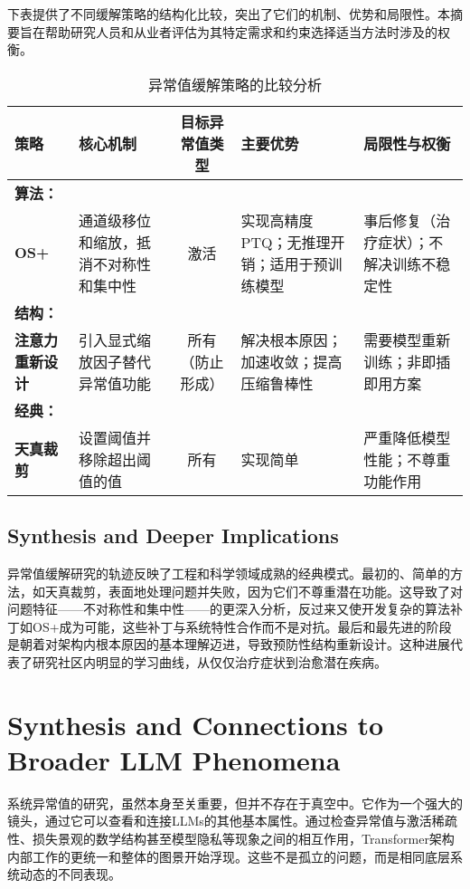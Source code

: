 \documentclass{article}
\begin{document}
下表提供了不同缓解策略的结构化比较，突出了它们的机制、优势和局限性。本摘要旨在帮助研究人员和从业者评估为其特定需求和约束选择适当方法时涉及的权衡。

\begin{table}
  \caption{异常值缓解策略的比较分析}
  \label{mitigation-strategies}
  \centering
  \small
  \begin{tabular}{l p{3.5cm} c p{3cm} p{3cm}}
    \toprule
    策略 & 核心机制 & 目标异常值类型 & 主要优势 & 局限性与权衡 \\
    \midrule
    \textbf{算法：}\\\textbf{OS+} & 通道级移位和缩放，抵消不对称性和集中性 & 激活 & 实现高精度PTQ；无推理开销；适用于预训练模型 & 事后修复（治疗症状）；不解决训练不稳定性 \\
    \textbf{结构：}\\\textbf{注意力重新设计} & 引入显式缩放因子替代异常值功能 & 所有（防止形成） & 解决根本原因；加速收敛；提高压缩鲁棒性 & 需要模型重新训练；非即插即用方案 \\
    \textbf{经典：}\\\textbf{天真裁剪} & 设置阈值并移除超出阈值的值 & 所有 & 实现简单 & 严重降低模型性能；不尊重功能作用 \\
    \bottomrule
  \end{tabular}
\end{table}

\subsection{Synthesis and Deeper Implications}

异常值缓解研究的轨迹反映了工程和科学领域成熟的经典模式。最初的、简单的方法，如天真裁剪，表面地处理问题并失败，因为它们不尊重潜在功能。这导致了对问题特征——不对称性和集中性——的更深入分析，反过来又使开发复杂的算法补丁如OS+成为可能，这些补丁与系统特性合作而不是对抗。最后和最先进的阶段是朝着对架构内根本原因的基本理解迈进，导致预防性结构重新设计。这种进展代表了研究社区内明显的学习曲线，从仅仅治疗症状到治愈潜在疾病。

\section{Synthesis and Connections to Broader LLM Phenomena}

系统异常值的研究，虽然本身至关重要，但并不存在于真空中。它作为一个强大的镜头，通过它可以查看和连接LLMs的其他基本属性。通过检查异常值与激活稀疏性、损失景观的数学结构甚至模型隐私等现象之间的相互作用，Transformer架构内部工作的更统一和整体的图景开始浮现。这些不是孤立的问题，而是相同底层系统动态的不同表现。
\end{document}
